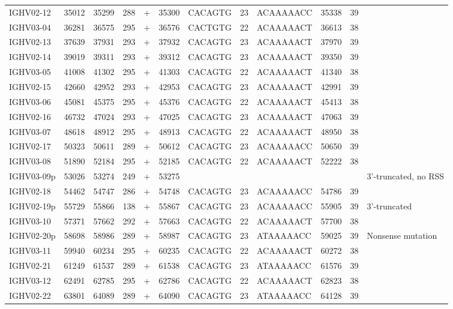 \begin{tabular}{lrrrlrlllrrl}
  IGHV02-12 & 35012 & 35299 & 288 & + & 35300 & CACAGTG & 23 & ACAAAAACC & 35338 & 39 &  \\ 
  IGHV03-04 & 36281 & 36575 & 295 & + & 36576 & CACTGTG & 22 & ACAAAAACT & 36613 & 38 &  \\ 
  IGHV02-13 & 37639 & 37931 & 293 & + & 37932 & CACAGTG & 23 & ACAAAAACT & 37970 & 39 &  \\ 
  IGHV02-14 & 39019 & 39311 & 293 & + & 39312 & CACAGTG & 23 & ACAAAAACT & 39350 & 39 &  \\ 
  IGHV03-05 & 41008 & 41302 & 295 & + & 41303 & CACAGTG & 22 & ACAAAAACT & 41340 & 38 &  \\ 
  IGHV02-15 & 42660 & 42952 & 293 & + & 42953 & CACAGTG & 23 & ACAAAAACT & 42991 & 39 &  \\ 
  IGHV03-06 & 45081 & 45375 & 295 & + & 45376 & CACAGTG & 22 & ACAAAAACT & 45413 & 38 &  \\ 
  IGHV02-16 & 46732 & 47024 & 293 & + & 47025 & CACAGTG & 23 & ACAAAAACT & 47063 & 39 &  \\ 
  IGHV03-07 & 48618 & 48912 & 295 & + & 48913 & CACAGTG & 22 & ACAAAAACT & 48950 & 38 &  \\ 
  IGHV02-17 & 50323 & 50611 & 289 & + & 50612 & CACAGTG & 23 & ACAAAAACC & 50650 & 39 &  \\ 
  IGHV03-08 & 51890 & 52184 & 295 & + & 52185 & CACAGTG & 22 & ACAAAAACT & 52222 & 38 &  \\ 
  IGHV03-09p & 53026 & 53274 & 249 & + & 53275 &  &  &  &  &  & 3'-truncated, no RSS \\ 
  IGHV02-18 & 54462 & 54747 & 286 & + & 54748 & CACAGTG & 23 & ACAAAAACC & 54786 & 39 &  \\ 
  IGHV02-19p & 55729 & 55866 & 138 & + & 55867 & CACAGTG & 23 & ACAAAAACC & 55905 & 39 & 3'-truncated \\ 
  IGHV03-10 & 57371 & 57662 & 292 & + & 57663 & CACAGTG & 22 & ACAAAAACT & 57700 & 38 &  \\ 
  IGHV02-20p & 58698 & 58986 & 289 & + & 58987 & CACAGTG & 23 & ATAAAAACC & 59025 & 39 & Nonsense mutation \\ 
  IGHV03-11 & 59940 & 60234 & 295 & + & 60235 & CACAGTG & 22 & ACAAAAACT & 60272 & 38 &  \\ 
  IGHV02-21 & 61249 & 61537 & 289 & + & 61538 & CACAGTG & 23 & ATAAAAACC & 61576 & 39 &  \\ 
  IGHV03-12 & 62491 & 62785 & 295 & + & 62786 & CACAGTG & 22 & ACAAAAACT & 62823 & 38 &  \\ 
  IGHV02-22 & 63801 & 64089 & 289 & + & 64090 & CACAGTG & 23 & ATAAAAACC & 64128 & 39 &  \\ 

\end{tabular}
